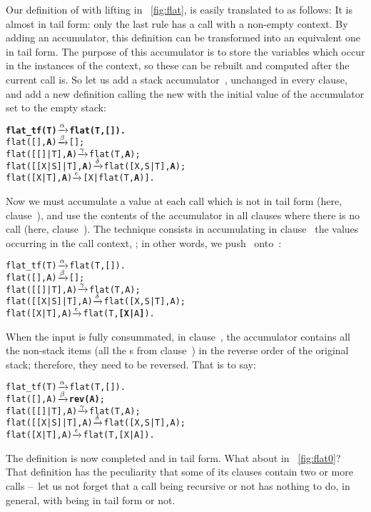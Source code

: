 \vspace*{-5mm}

\label{sec:into_tail_form}

Our definition of  with lifting in \fig~\vref{fig:flat},
is easily translated to \Erlang as follows: 
It is almost in tail form: only the last rule has a call with a
non\hyp{}empty context. By adding an accumulator, this definition can
be transformed into an equivalent one in tail form. The purpose of
this accumulator is to store the variables which occur in the
instances of the context, so these can be rebuilt and computed after
the current call is. So let us add a stack accumulator~,
unchanged in every clause, and add a new 
definition calling the new  with the initial value of
the accumulator set to the empty stack:
\begin{alltt}
\textbf{flat\_tf(T)        \(\xrightarrow{\smash{\alpha}}\) flat(T,[]).}
flat(       [],\textbf{A}) \(\xrightarrow{\smash{\beta}}\) [];\hfill% A \emph{unused yet}
flat(   [[]|T],\textbf{A}) \(\xrightarrow{\smash{\gamma}}\) flat(T,\textbf{A});
flat([[X|S]|T],\textbf{A}) \(\xrightarrow{\smash{\delta}}\) flat([X,S|T],\textbf{A});
flat(    [X|T],\textbf{A}) \(\xrightarrow{\smash{\epsilon}}\) [X|flat(T,\textbf{A})].
\end{alltt}
Now we must accumulate a value at each call which is not in tail form
(here, clause~\clause{\epsilon}), and use the contents of the
accumulator in all clauses where there is no call (here,
clause~\clause{\alpha}). The technique consists in accumulating in
clause~\clause{\epsilon} the values occurring in the call context,
\erlcode{[X|\textvisiblespace]}; in other words, we
push~ onto~:
\begin{alltt}
flat\_tf(T)        \(\smashedrightarrow{\alpha}\) flat(T,[]).
flat(       [],A) \(\smashedrightarrow{\beta}\) [];
flat(   [[]|T],A) \(\smashedrightarrow{\gamma}\) flat(T,A);
flat([[X|S]|T],A) \(\smashedrightarrow{\delta}\) flat([X,S|T],A);
flat(    [X|T],A) \(\smashedrightarrow{\epsilon}\) flat(T,\textbf{[X|}A\textbf{]}).\hfill% \emph{Here}
\end{alltt}
When the input is fully consummated, in clause~\clause{\beta}, the
accumulator contains all the non\hyp{}stack items (all the
s from clause~\clause{\epsilon}) in the reverse order of the
original stack; therefore, they need to be reversed. That is to say:
\begin{alltt}
flat\_tf(T)        \(\smashedrightarrow{\alpha}\) flat(T,[]).
flat(       [],A) \(\smashedrightarrow{\beta}\) \textbf{rev(A)};
flat(   [[]|T],A) \(\smashedrightarrow{\gamma}\) flat(T,A);
flat([[X|S]|T],A) \(\smashedrightarrow{\delta}\) flat([X,S|T],A);
flat(    [X|T],A) \(\smashedrightarrow{\epsilon}\) flat(T,[X|A]).
\end{alltt}
The definition is now completed and in tail form. What about
 in \fig~\vref{fig:flat0}?  
That definition has the peculiarity that some of its clauses contain
two or more calls --~let us not forget that a call being recursive or
not has nothing to do, in general, with being in tail form or not.

